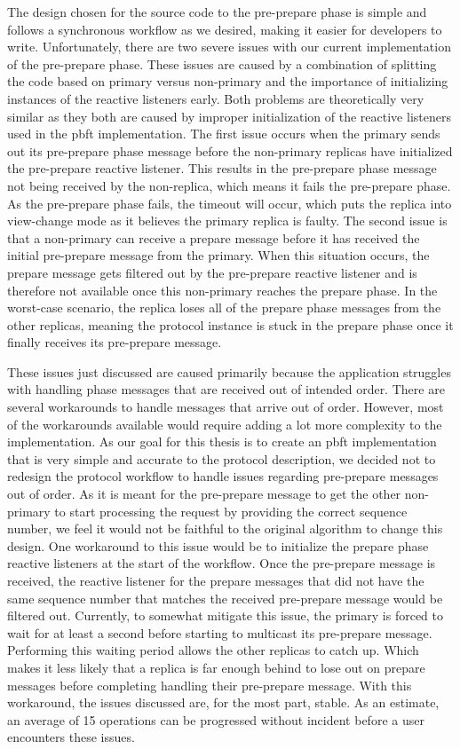 The design chosen for the source code to the pre-prepare phase is simple and follows a synchronous workflow as we desired, making it easier for developers to write. Unfortunately, there are two severe issues with our current implementation of the pre-prepare phase. These issues are caused by a combination of splitting the code based on primary versus non-primary and the importance of initializing instances of the reactive listeners early. Both problems are theoretically very similar as they both are caused by improper initialization of the reactive listeners used in the \ac{pbft} implementation. The first issue occurs when the primary sends out its pre-prepare phase message before the non-primary replicas have initialized the pre-prepare reactive listener. This results in the pre-prepare phase message not being received by the non-replica, which means it fails the pre-prepare phase. As the pre-prepare phase fails, the timeout will occur, which puts the replica into view-change mode as it believes the primary replica is faulty. The second issue is that a non-primary can receive a prepare message before it has received the initial pre-prepare message from the primary. When this situation occurs, the prepare message gets filtered out by the pre-prepare reactive listener and is therefore not available once this non-primary reaches the prepare phase. In the worst-case scenario, the replica loses all of the prepare phase messages from the other replicas, meaning the protocol instance is stuck in the prepare phase once it finally receives its pre-prepare message.

These issues just discussed are caused primarily because the application struggles with handling phase messages that are received out of intended order. There are several workarounds to handle messages that arrive out of order. However, most of the workarounds available would require adding a lot more complexity to the implementation. As our goal for this thesis is to create an \ac{pbft} implementation that is very simple and accurate to the protocol description, we decided not to redesign the protocol workflow to handle issues regarding pre-prepare messages out of order. As it is meant for the pre-prepare message to get the other non-primary to start processing the request by providing the correct sequence number, we feel it would not be faithful to the original algorithm to change this design. One workaround to this issue would be to initialize the prepare phase reactive listeners at the start of the workflow. Once the pre-prepare message is received, the reactive listener for the prepare messages that did not have the same sequence number that matches the received pre-prepare message would be filtered out. Currently, to somewhat mitigate this issue, the primary is forced to wait for at least a second before starting to multicast its pre-prepare message. Performing this waiting period allows the other replicas to catch up. Which makes it less likely that a replica is far enough behind to lose out on prepare messages before completing handling their pre-prepare message. With this workaround, the issues discussed are, for the most part, stable. As an estimate, an average of 15 operations can be progressed without incident before a user encounters these issues.


